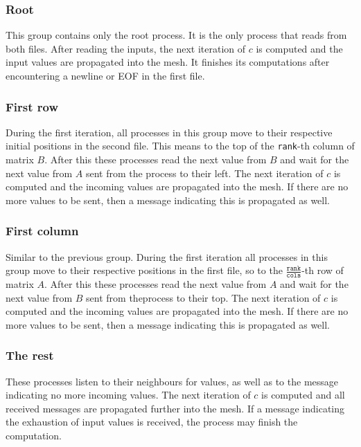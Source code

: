 \documentclass[pdftex, 11pt, a4paper, titlepage]{article}
\begin{document}
    \subsubsection*{Root}
    This group contains only the root process. It is the only process that reads from
    both files. After reading the inputs, the next iteration of $c$ is computed and
    the input values are propagated into the mesh. It finishes its computations after
    encountering a newline or EOF in the first file.

    \subsubsection*{First row}
    During the first iteration, all processes in this group move to their respective
    initial positions in the second file. This means to the top of the \texttt{rank}-th
    column of matrix $B$. After this these processes read the next value from $B$ and
    wait for the next value from $A$ sent from the process to their left.
    The next iteration of $c$ is computed and the incoming values are propagated into
    the mesh. If there are no more values to be sent, then a message indicating this
    is propagated as well.

    \subsubsection*{First column}
    Similar to the previous group. During the first iteration all processes in this
    group move to their respective positions in the first file, so to
    the $\frac{\texttt{rank}}{\texttt{cols}}$-th row of matrix $A$. After this these
    processes read the next value from $A$ and wait for the next value from $B$ sent
    from theprocess to their top. The next iteration of $c$ is computed and the
    incoming values are propagated into the mesh. If there are no more values
    to be sent, then a message indicating this is propagated as well.

    \subsubsection*{The rest}
    These processes listen to their neighbours for values, as well as to the message
    indicating no more incoming values. The next iteration of $c$ is computed and
    all received messages are propagated further into the mesh. If a message
    indicating the exhaustion of input values is received, the process may finish
    the computation.
\end{document}
